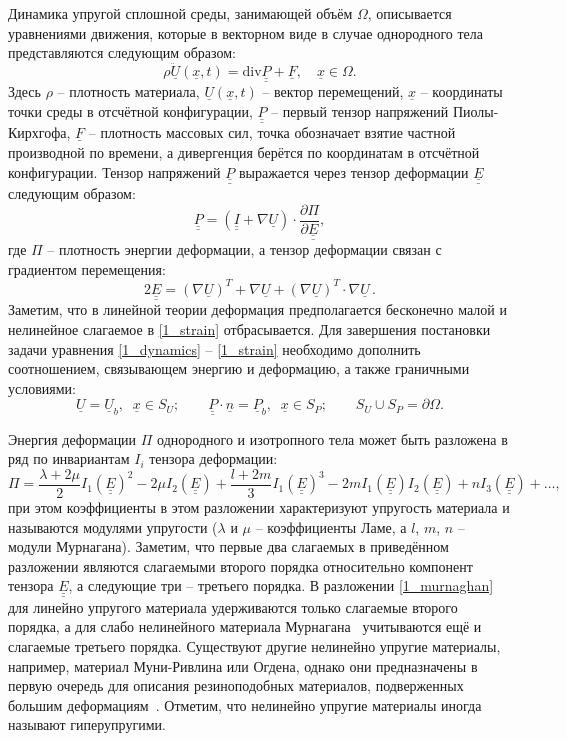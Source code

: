\documentclass[12pt, a4paper]{report}
\newcommand{\vect}[1]{\underline{#1}}
\newcommand{\tens}[1]{\underline{\underline{#1}}}
\newcommand{\divg}{\text{div}}
\newcommand{\pdiff}[2]{\frac{\partial #1}{\partial #2}}
\begin{document}
Динамика упругой сплошной среды, занимающей объём $\Omega$, описывается уравнениями движения, которые в векторном виде в случае однородного тела представляются следующим образом:
\begin{equation}\label{1_dynamics}
\rho\ddot{\vect{U}}(\vect{x}, t) = \divg \tens{P} + \vect{F}, \quad \vect{x}\in\Omega.
\end{equation}
Здесь $\rho$ -- плотность материала, $\vect{U}(\vect{x},t)$ -- вектор перемещений, $\vect{x}$ -- координаты точки среды в отсчётной конфигурации, $\tens{P}$ -- первый тензор напряжений Пиолы-Кирхгофа, $\vect{F}$ -- плотность массовых сил, точка обозначает взятие частной производной по времени, а дивергенция берётся по координатам в отсчётной конфигурации. Тензор напряжений $\tens{P}$ выражается через тензор деформации $\tens{E}$ следующим образом:
\begin{equation} \label{1_piola}
\tens{P} = (\tens{I} + \nabla\vect{U}) \cdot \pdiff{\Pi}{\tens{E}},
\end{equation}
где $\Pi$ -- плотность энергии деформации, а тензор деформации связан с градиентом перемещения:
\begin{equation}\label{1_strain}
2\tens{E} = (\nabla\vect{U})^T + \nabla\vect{U} + (\nabla\vect{U})^T\cdot\nabla\vect{U} \,.
\end{equation}
Заметим, что в линейной теории деформация предполагается бесконечно малой и нелинейное слагаемое в \eqref{1_strain} отбрасывается. Для завершения постановки задачи уравнения \eqref{1_dynamics} -- \eqref{1_strain} необходимо дополнить соотношением, связывающем энергию и деформацию, а также граничными условиями:
\begin{equation}\label{1_bc}
\vect{U} = \vect{U}_b, \;\; \vect{x}\in S_U; \qquad \tens{P}\cdot\vect{n} = \vect{P}_b, \;\; \vect{x}\in S_P; \qquad S_U\cup S_P = \partial\Omega.
\end{equation}

Энергия деформации $\Pi$ однородного и изотропного тела может быть разложена в ряд по инвариантам $I_i$ тензора деформации:
\begin{equation}\label{1_murnaghan}
\Pi = \frac{\lambda + 2\mu}{2}I_1(\tens{E})^2 - 2\mu I_2(\tens{E}) + \frac{l+2m}{3}I_1(\tens{E})^3 - 2m I_1(\tens{E}) I_2(\tens{E}) + n I_3(\tens{E}) + \dots,
\end{equation}
при этом коэффициенты в этом разложении характеризуют упругость материала и называются модулями упругости ($\lambda$ и $\mu$ -- коэффициенты Ламе, а $l$, $m$, $n$ -- модули Мурнагана). Заметим, что первые два слагаемых в приведённом разложении являются слагаемыми второго порядка относительно компонент тензора $\tens{E}$, а следующие три -- третьего порядка.
В разложении \eqref{1_murnaghan} для линейно упругого материала удерживаются только слагаемые второго порядка, а для слабо нелинейного материала Мурнагана~\cite{Murnaghan} учитываются ещё и слагаемые третьего порядка. Существуют другие нелинейно упругие материалы, например, материал Муни-Ривлина или Огдена, однако они предназначены в первую очередь для описания резиноподобных материалов, подверженных большим деформациям~\cite{Bergstrom}. Отметим, что нелинейно упругие материалы иногда называют гиперупругими.
\end{document}

